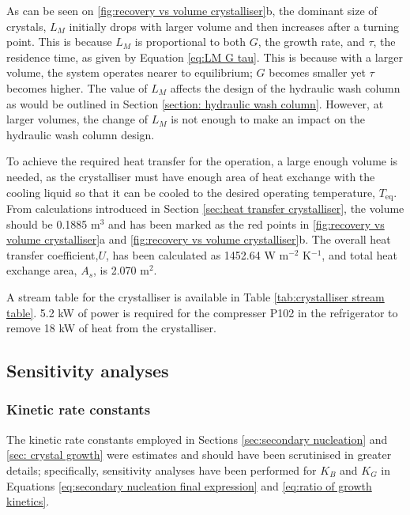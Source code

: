 As can be seen on \cref{fig:recovery vs volume crystalliser}b, the dominant size of crystals, $L_M$ initially drops with larger volume and then increases after a turning point. This is because $L_M$ is proportional to both $G$, the growth rate, and $\tau$, the residence time, as given by Equation \ref{eq:LM G tau}. This is because with a larger volume, the system operates nearer to equilibrium; $G$ becomes smaller yet $\tau$ becomes higher. The value of $L_M$ affects the design of the hydraulic wash column as would be outlined in Section \ref{section: hydraulic wash column}. However, at larger volumes, the change of $L_M$ is not enough to make an impact on the hydraulic wash column design. 

To achieve the required heat transfer for the operation, a large enough volume is needed, as the crystalliser must have enough area of heat exchange with the cooling liquid so that it can be cooled to the desired operating temperature, $T_{\mathrm{eq}}$. From calculations introduced in Section \ref{sec:heat transfer crystalliser}, the volume should be 0.1885 m$^3$ and has been marked as the red points in \cref{fig:recovery vs volume crystalliser}a and \cref{fig:recovery vs volume crystalliser}b. The overall heat transfer coefficient,$U$, has been calculated as 1452.64 W m$^{-2}$ K$^{-1}$, and total heat exchange area, $A_s$, is 2.070 m$^2$. 

A stream table for the crystalliser is available in Table \ref{tab:crystalliser stream table}. 5.2 kW of power is required for the compresser P102 in the refrigerator to remove 18 kW of heat from the crystalliser. 

\subsection{Sensitivity analyses}

\subsubsection{Kinetic rate constants}\label{sec:kinetics sensitivity}

The kinetic rate constants employed in Sections \ref{sec:secondary nucleation} and \ref{sec: crystal growth} were estimates and should have been scrutinised in greater details; specifically, sensitivity analyses have been performed for $K_B$ and $K_G$ in Equations \ref{eq:secondary nucleation final expression} and \ref{eq:ratio of growth kinetics}.

